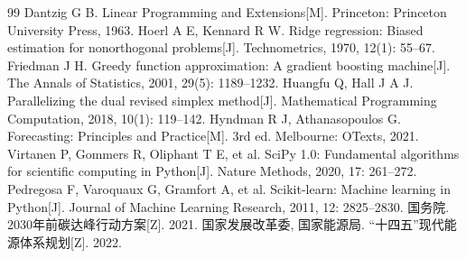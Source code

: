 \documentclass[11pt,a4paper]{article}
\begin{document}
\newpage
\begin{thebibliography}{99}
 Dantzig G B. Linear Programming and Extensions[M]. Princeton: Princeton University Press, 1963.
 Hoerl A E, Kennard R W. Ridge regression: Biased estimation for nonorthogonal problems[J]. Technometrics, 1970, 12(1): 55--67.
 Friedman J H. Greedy function approximation: A gradient boosting machine[J]. The Annals of Statistics, 2001, 29(5): 1189--1232.
 Huangfu Q, Hall J A J. Parallelizing the dual revised simplex method[J]. Mathematical Programming Computation, 2018, 10(1): 119--142.
 Hyndman R J, Athanasopoulos G. Forecasting: Principles and Practice[M]. 3rd ed. Melbourne: OTexts, 2021.
 Virtanen P, Gommers R, Oliphant T E, et al. SciPy 1.0: Fundamental algorithms for scientific computing in Python[J]. Nature Methods, 2020, 17: 261--272.
 Pedregosa F, Varoquaux G, Gramfort A, et al. Scikit-learn: Machine learning in Python[J]. Journal of Machine Learning Research, 2011, 12: 2825--2830.
 国务院. 2030年前碳达峰行动方案[Z]. 2021.
 国家发展改革委, 国家能源局. “十四五”现代能源体系规划[Z]. 2022.
\end{thebibliography}
\end{document}
